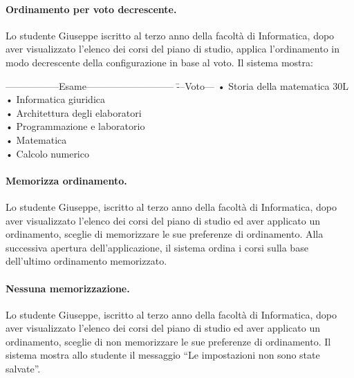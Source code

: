  
\paragraph{Ordinamento per voto decrescente.}
Lo studente Giuseppe iscritto al terzo anno della facoltà di Informatica, dopo aver visualizzato l'elenco dei corsi del piano di studio, applica l'ordinamento in modo decrescente della configurazione in base al voto. Il sistema mostra:
\begin{tabbing}
	\hspace{1cm}-----------------Esame--------------------------- \= ---Voto--- \kill
	\hspace{1cm} • Storia della matematica \> 30L\\
	\hspace{1cm} • Informatica giuridica \\
	\hspace{1cm} • Architettura degli elaboratori \\
	\hspace{1cm} • Programmazione e laboratorio \\
	\hspace{1cm} • Matematica \\
	\hspace{1cm} • Calcolo numerico \\
\end{tabbing}

\paragraph{Memorizza ordinamento.}
Lo studente Giuseppe, iscritto al terzo anno della facoltà di Informatica, dopo aver visualizzato l’elenco dei corsi del piano di studio ed aver applicato un ordinamento, sceglie di memorizzare le sue preferenze di ordinamento. Alla successiva apertura dell’applicazione, il sistema ordina i corsi sulla base dell'ultimo ordinamento memorizzato.

\paragraph{Nessuna memorizzazione.}
Lo studente Giuseppe, iscritto al terzo anno della facoltà di Informatica, dopo aver visualizzato l’elenco dei corsi del piano di studio ed aver applicato un ordinamento, sceglie di non memorizzare le sue preferenze di ordinamento. Il sistema mostra allo studente il messaggio “Le impostazioni non sono state salvate”. 

